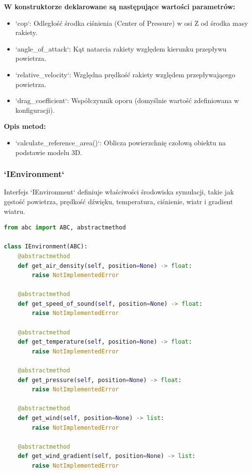 \textbf{W konstruktorze deklarowane są następujące wartości parametrów:}
\begin{itemize}
    \item `cop`: Odległość środka ciśnienia (Center of Pressure) w osi Z od środka masy rakiety.
    \item `angle\_of\_attack`: Kąt natarcia rakiety względem kierunku przepływu powietrza.
    \item `relative\_velocity`: Względna prędkość rakiety względem przepływającego powietrza.
    \item `drag\_coefficient`: Współczynnik oporu (domyślnie wartość zdefiniowana w konfiguracji).
\end{itemize}

\textbf{Opis metod:}
\begin{itemize}
    \item `calculate\_reference\_area()`: Oblicza powierzchnię czołową obiektu na podstawie modelu 3D.
\end{itemize}

\subsubsection{`IEnvironment`}

Interfejs `IEnvironment` definiuje właściwości środowiska symulacji, takie
jak gęstość powietrza, prędkość dźwięku, temperatura, ciśnienie, wiatr i
gradient wiatru.

\begin{lstlisting}[language=Python]
from abc import ABC, abstractmethod

class IEnvironment(ABC):
    @abstractmethod
    def get_air_density(self, position=None) -> float:
        raise NotImplementedError

    @abstractmethod
    def get_speed_of_sound(self, position=None) -> float:
        raise NotImplementedError

    @abstractmethod
    def get_temperature(self, position=None) -> float:
        raise NotImplementedError

    @abstractmethod
    def get_pressure(self, position=None) -> float:
        raise NotImplementedError

    @abstractmethod
    def get_wind(self, position=None) -> list:
        raise NotImplementedError

    @abstractmethod
    def get_wind_gradient(self, position=None) -> list:
        raise NotImplementedError
\end{lstlisting}

